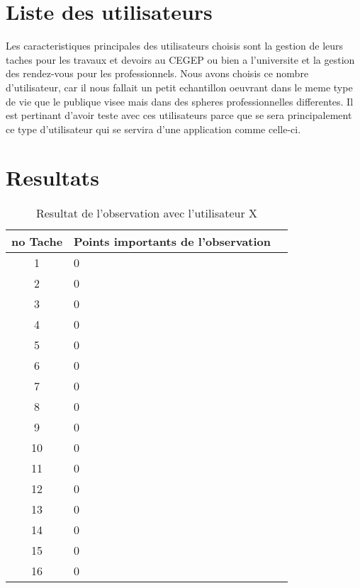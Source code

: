 \documentclass[letterpaper, oneside, 12pt, these, creativecommons]{thETS}
\begin{document}
\section{Liste des utilisateurs}

Les caracteristiques principales des utilisateurs choisis sont la gestion de leurs taches pour les travaux et devoirs au CEGEP ou bien a l'universite et la gestion des rendez-vous pour les professionnels. Nous avons choisis ce nombre d'utilisateur, car il nous fallait un petit echantillon oeuvrant dans le meme type de vie que le publique visee mais dans des spheres professionnelles differentes. Il est pertinant d'avoir teste avec ces utilisateurs parce que se sera principalement ce type d'utilisateur qui se servira d'une application comme celle-ci.

\newpage

\section{Resultats}

\begin{table}
	\centering
	\begin{tabular}{|c|l|l|}
	\hline
	no Tache	& Points importants de l'observation	 	\\ \hline
	1		& 0						\\ \hline
	2		& 0						\\ \hline
	3		& 0						\\ \hline
	4		& 0						\\ \hline
	5		& 0						\\ \hline
	6		& 0						\\ \hline
	7		& 0						\\ \hline
	8		& 0						\\ \hline
	9		& 0						\\ \hline
	10		& 0						\\ \hline
	11		& 0						\\ \hline
	12		& 0						\\ \hline
	13		& 0						\\ \hline
	14		& 0						\\ \hline
	15		& 0						\\ \hline
	16		& 0						\\ \hline
	\end{tabular}
	\caption{Resultat de l'observation avec l'utilisateur X}
\end{table}

\newpage
\end{document}
